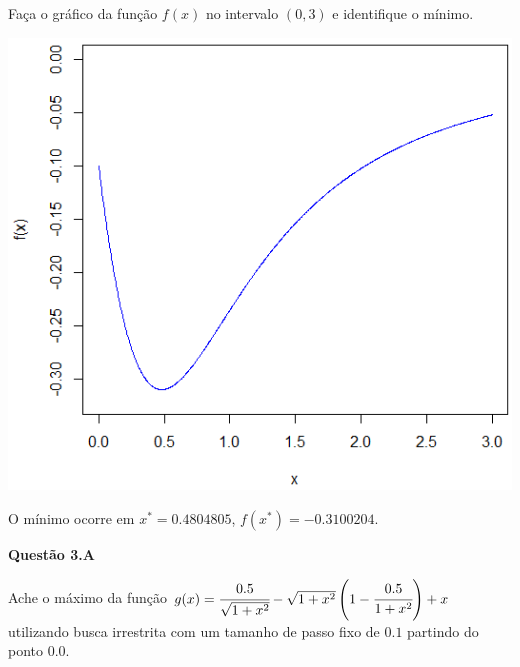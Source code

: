 \documentclass{rbfin}
\begin{document}
\normalsize

\vspace{6mm}

\doublespacing

Faça o gráfico da função $f(x)$ no intervalo $(0, 3)$ e identifique o mínimo.

\begin{center}
\includegraphics[scale=0.666]{q2}
\end{center}

O mínimo ocorre em $x^* = 0.4804805$, $f(x^*) = -0.3100204$.

\singlespacing

\vspace{6mm}

\large

\textbf{Questão 3.A}

\normalsize

\vspace{6mm}

\doublespacing

Ache o máximo da função $g(x) = \cfrac{0.5}{\sqrt{1 + x^2}} - \sqrt{1 + x^2} \left( 1 - \cfrac{0.5}{1 + x^2} \right) + x$ utilizando busca irrestrita com um tamanho de passo fixo de $0.1$ partindo do ponto $0.0$.

\singlespacing

\vspace{6mm}

\large
\end{document}

